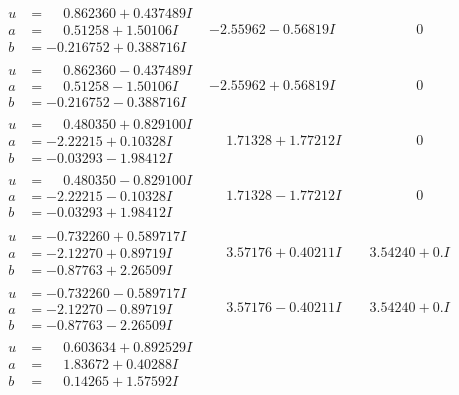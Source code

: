 \documentclass[1p]{elsarticle_modified}
\theoremstyle{definition}
\begin{document}
$$\begin{array}{c|c|c}
\begin{aligned}
u &= \phantom{-}0.862360 + 0.437489 I \\
a &= \phantom{-}0.51258 + 1.50106 I \\
b &= -0.216752 + 0.388716 I\end{aligned}
 & -2.55962 - 0.56819 I & \phantom{-0.000000 } 0 \\ \hline\begin{aligned}
u &= \phantom{-}0.862360 - 0.437489 I \\
a &= \phantom{-}0.51258 - 1.50106 I \\
b &= -0.216752 - 0.388716 I\end{aligned}
 & -2.55962 + 0.56819 I & \phantom{-0.000000 } 0 \\ \hline\begin{aligned}
u &= \phantom{-}0.480350 + 0.829100 I \\
a &= -2.22215 + 0.10328 I \\
b &= -0.03293 - 1.98412 I\end{aligned}
 & \phantom{-}1.71328 + 1.77212 I & \phantom{-0.000000 } 0 \\ \hline\begin{aligned}
u &= \phantom{-}0.480350 - 0.829100 I \\
a &= -2.22215 - 0.10328 I \\
b &= -0.03293 + 1.98412 I\end{aligned}
 & \phantom{-}1.71328 - 1.77212 I & \phantom{-0.000000 } 0 \\ \hline\begin{aligned}
u &= -0.732260 + 0.589717 I \\
a &= -2.12270 + 0.89719 I \\
b &= -0.87763 + 2.26509 I\end{aligned}
 & \phantom{-}3.57176 + 0.40211 I & \phantom{-}3.54240 + 0. I\phantom{ +0.000000I} \\ \hline\begin{aligned}
u &= -0.732260 - 0.589717 I \\
a &= -2.12270 - 0.89719 I \\
b &= -0.87763 - 2.26509 I\end{aligned}
 & \phantom{-}3.57176 - 0.40211 I & \phantom{-}3.54240 + 0. I\phantom{ +0.000000I} \\ \hline\begin{aligned}
u &= \phantom{-}0.603634 + 0.892529 I \\
a &= \phantom{-}1.83672 + 0.40288 I \\
b &= \phantom{-}0.14265 + 1.57592 I\end{aligned}

\end{array}$$
\end{document}
